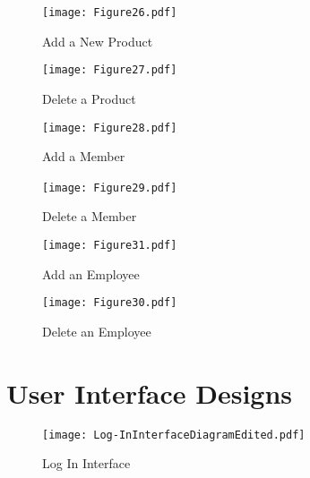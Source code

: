 \begin{landscape}
\begin{figure}[H]
\caption{Add a New Product} \label{fig:Add a New Product}
\hfill\texttt{[image: Figure26.pdf]}\hspace*{\fill}
\end{figure}
\pagebreak

\begin{figure}[H]
\caption{Delete a Product} \label{fig:Delete a Product}
\hfill\texttt{[image: Figure27.pdf]}\hspace*{\fill}
\end{figure}
\pagebreak

\begin{figure}[H]
\caption{Add a Member} \label{fig:Add a Member}
\hfill\texttt{[image: Figure28.pdf]}\hspace*{\fill}
\end{figure}
\pagebreak

\begin{figure}[H]
\caption{Delete a Member} \label{fig:Delete a Member}
\hfill\texttt{[image: Figure29.pdf]}\hspace*{\fill}\
\end{figure}
\pagebreak

\begin{figure}[H]
\caption{Add an Employee} \label{fig:Add an Employee}
\hfill\texttt{[image: Figure31.pdf]}\hspace*{\fill}
\end{figure}
\pagebreak

\begin{figure}[H]
\caption{Delete an Employee} \label{fig:Delete an Employee}
\hfill\texttt{[image: Figure30.pdf]}\hspace*{\fill}
\end{figure}
\pagebreak

\end{landscape}
\section{User Interface Designs}


\begin{figure}[H]
\caption{Log In Interface} \label{fig: Log In Interface}
\hfill\texttt{[image: Log-InInterfaceDiagramEdited.pdf]}\hspace*{\fill}
\end{figure}


